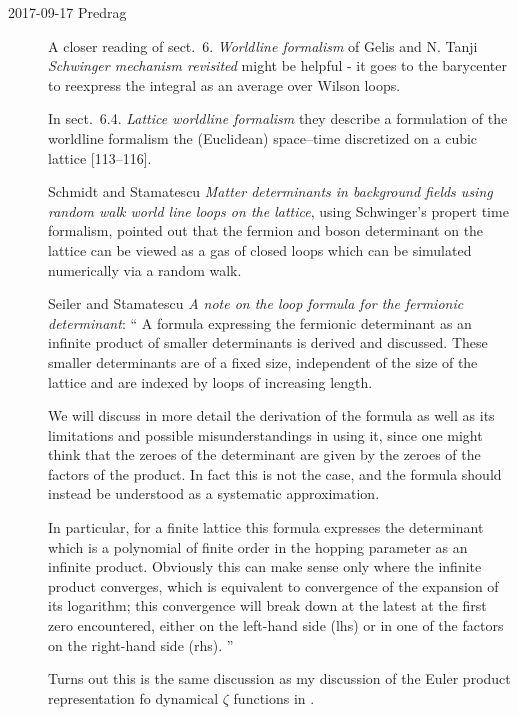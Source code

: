 \begin{description}
\item[2017-09-17 Predrag]
A closer reading of sect.~6. {\em Worldline formalism} of Gelis and N.
Tanji {\em Schwinger mechanism revisited} might be helpful - it
goes to the barycenter to reexpress the integral as an average over Wilson
loops.

In sect.~6.4. {\em Lattice worldline formalism} they describe a
formulation of the worldline formalism the (Euclidean) space–time
discretized on a cubic lattice  [113–116].

Schmidt and Stamatescu {\em Matter determinants in
background fields using random walk world line loops on the lattice},
using Schwinger's propert time formalism, pointed out that the fermion and
boson determinant on the lattice can be viewed as a gas of closed loops
which can be simulated numerically via a random walk.

Seiler and Stamatescu
{\em A note on the loop formula for the fermionic determinant}: ``
A formula expressing the fermionic determinant as an infinite product of
smaller determinants is derived and discussed. These smaller determinants are
of a fixed size, independent of the size of the lattice and are indexed by
loops of increasing length.

We will discuss in more detail the derivation of the formula as well as its
limitations and possible misunderstandings in using it, since one might think
that the zeroes of the determinant are given by the zeroes of the factors of
the product. In fact this is not the case, and the formula should instead be
understood as a systematic approximation.

In particular, for a finite lattice this formula expresses the determinant
which is a polynomial of finite order in the hopping parameter as an infinite
product. Obviously this can make sense only where the infinite product
converges, which is equivalent to convergence of the expansion of its
logarithm; this convergence will break down at the latest at the first zero
encountered, either on the left-hand side (lhs) or in one of the factors on
the right-hand side (rhs).
''

Turns out this is the same discussion as my discussion of the Euler product
representation fo dynamical $\zeta$ functions in \wwwcb{}.


\end{description}
